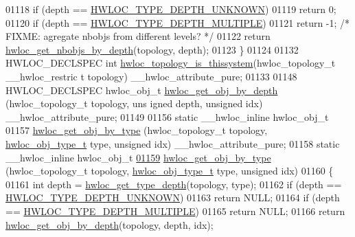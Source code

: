 \begin{DoxyCode}
01118         \textcolor{keywordflow}{if} (depth == \hyperlink{a00046_ggaf4e663cf42bbe20756b849c6293ef575a0565ab92ab72cb0cec91e23003294aad}{HWLOC_TYPE_DEPTH_UNKNOWN})
01119                 \textcolor{keywordflow}{return} 0;
01120         \textcolor{keywordflow}{if} (depth == \hyperlink{a00046_ggaf4e663cf42bbe20756b849c6293ef575ae99465995cacde6c210d5fc2e409798c}{HWLOC_TYPE_DEPTH_MULTIPLE})
01121                 \textcolor{keywordflow}{return} -1; \textcolor{comment}{/* FIXME: agregate nbobjs from different levels? */}
01122         \textcolor{keywordflow}{return} \hyperlink{a00046_ga20cfe2456f4cfdd789c9aca6d2fdd69f}{hwloc_get_nbobjs_by_depth}(topology, depth);
01123 \}
01124 
01132 HWLOC\_DECLSPEC \textcolor{keywordtype}{int} \hyperlink{a00046_ga0d109e33fc7990f62f665d336e5e5111}{hwloc_topology_is_thissystem}(hwloc\_topology\_t  \_\_hwloc\_restric
      t topology) \_\_hwloc\_attribute\_pure;
01133 
01148 HWLOC\_DECLSPEC hwloc\_obj\_t \hyperlink{a00047_gaedd78240b0c1108355586a268ec5a697}{hwloc_get_obj_by_depth} (hwloc\_topology\_t topology, \textcolor{keywordtype}{uns
      igned} depth, \textcolor{keywordtype}{unsigned} idx) \_\_hwloc\_attribute\_pure;
01149 
01156 \textcolor{keyword}{static} \_\_hwloc\_inline hwloc\_obj\_t
01157 \hyperlink{a00047_ga9be4a03488cdd0fb431e4aa1cbdea895}{hwloc_get_obj_by_type} (hwloc\_topology\_t topology, \hyperlink{a00041_gacd37bb612667dc437d66bfb175a8dc55}{hwloc_obj_type_t} type, \textcolor{keywordtype}{unsigned
      } idx) \_\_hwloc\_attribute\_pure;
01158 \textcolor{keyword}{static} \_\_hwloc\_inline hwloc\_obj\_t
\hypertarget{a00033_source_l01159}{}\hyperlink{a00047_ga9be4a03488cdd0fb431e4aa1cbdea895}{01159} \hyperlink{a00047_ga9be4a03488cdd0fb431e4aa1cbdea895}{hwloc_get_obj_by_type} (hwloc\_topology\_t topology, \hyperlink{a00041_gacd37bb612667dc437d66bfb175a8dc55}{hwloc_obj_type_t} type, \textcolor{keywordtype}{unsigned
      } idx)
01160 \{
01161   \textcolor{keywordtype}{int} depth = \hyperlink{a00046_gaea7c64dd59467f5201ba87712710b14d}{hwloc_get_type_depth}(topology, type);
01162   \textcolor{keywordflow}{if} (depth == \hyperlink{a00046_ggaf4e663cf42bbe20756b849c6293ef575a0565ab92ab72cb0cec91e23003294aad}{HWLOC_TYPE_DEPTH_UNKNOWN})
01163     \textcolor{keywordflow}{return} NULL;
01164   \textcolor{keywordflow}{if} (depth == \hyperlink{a00046_ggaf4e663cf42bbe20756b849c6293ef575ae99465995cacde6c210d5fc2e409798c}{HWLOC_TYPE_DEPTH_MULTIPLE})
01165     \textcolor{keywordflow}{return} NULL;
01166   \textcolor{keywordflow}{return} \hyperlink{a00047_gaedd78240b0c1108355586a268ec5a697}{hwloc_get_obj_by_depth}(topology, depth, idx);

\end{DoxyCode}
